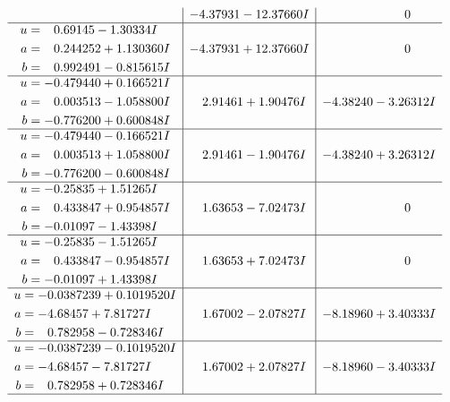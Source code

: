 \documentclass[1p]{elsarticle_modified}
\theoremstyle{definition}
\begin{document}
$$\begin{array}{c|c|c}
 & -4.37931 - 12.37660 I & \phantom{-0.000000 } 0 \\ \hline\begin{aligned}
u &= \phantom{-}0.69145 - 1.30334 I \\
a &= \phantom{-}0.244252 + 1.130360 I \\
b &= \phantom{-}0.992491 - 0.815615 I\end{aligned}
 & -4.37931 + 12.37660 I & \phantom{-0.000000 } 0 \\ \hline\begin{aligned}
u &= -0.479440 + 0.166521 I \\
a &= \phantom{-}0.003513 - 1.058800 I \\
b &= -0.776200 + 0.600848 I\end{aligned}
 & \phantom{-}2.91461 + 1.90476 I & -4.38240 - 3.26312 I \\ \hline\begin{aligned}
u &= -0.479440 - 0.166521 I \\
a &= \phantom{-}0.003513 + 1.058800 I \\
b &= -0.776200 - 0.600848 I\end{aligned}
 & \phantom{-}2.91461 - 1.90476 I & -4.38240 + 3.26312 I \\ \hline\begin{aligned}
u &= -0.25835 + 1.51265 I \\
a &= \phantom{-}0.433847 + 0.954857 I \\
b &= -0.01097 - 1.43398 I\end{aligned}
 & \phantom{-}1.63653 - 7.02473 I & \phantom{-0.000000 } 0 \\ \hline\begin{aligned}
u &= -0.25835 - 1.51265 I \\
a &= \phantom{-}0.433847 - 0.954857 I \\
b &= -0.01097 + 1.43398 I\end{aligned}
 & \phantom{-}1.63653 + 7.02473 I & \phantom{-0.000000 } 0 \\ \hline\begin{aligned}
u &= -0.0387239 + 0.1019520 I \\
a &= -4.68457 + 7.81727 I \\
b &= \phantom{-}0.782958 - 0.728346 I\end{aligned}
 & \phantom{-}1.67002 - 2.07827 I & -8.18960 + 3.40333 I \\ \hline\begin{aligned}
u &= -0.0387239 - 0.1019520 I \\
a &= -4.68457 - 7.81727 I \\
b &= \phantom{-}0.782958 + 0.728346 I\end{aligned}
 & \phantom{-}1.67002 + 2.07827 I & -8.18960 - 3.40333 I\\
 \hline 
 \end{array}$$\newpage\newpage\renewcommand{\arraystretch}{1}
\end{document}
